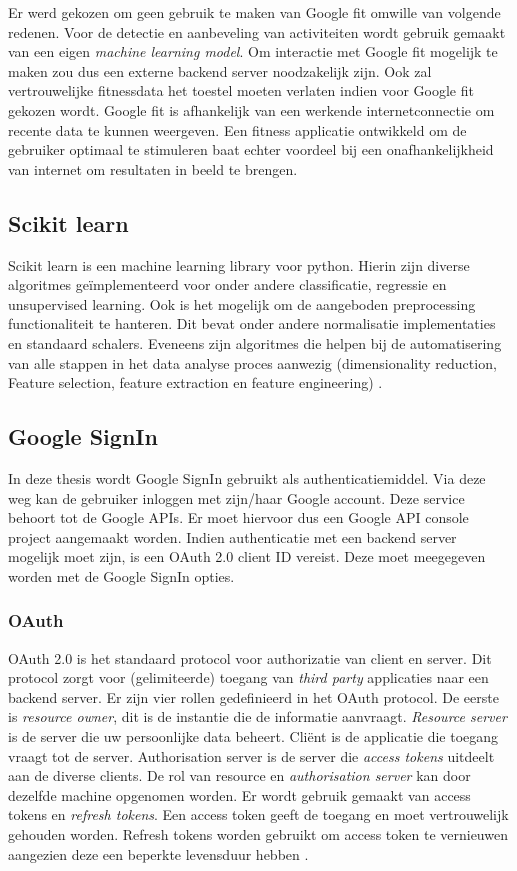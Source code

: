 \noindent
Er werd gekozen om geen gebruik te maken van Google fit omwille van volgende redenen. Voor de detectie en aanbeveling van activiteiten wordt gebruik gemaakt van een eigen \textit{machine learning model}. Om interactie met Google fit mogelijk te maken zou dus een externe backend server noodzakelijk zijn. 
Ook zal vertrouwelijke fitnessdata het toestel moeten verlaten indien voor Google fit gekozen wordt. 
Google fit is afhankelijk van een werkende internetconnectie om recente data te kunnen weergeven. Een fitness applicatie ontwikkeld om de gebruiker optimaal te stimuleren baat echter voordeel bij een onafhankelijkheid van internet om resultaten in beeld te brengen.

\subsection{Scikit learn}
Scikit learn is een machine learning library voor python. Hierin zijn diverse algoritmes geïmplementeerd voor onder andere classificatie, regressie en unsupervised learning. Ook is het mogelijk om de aangeboden preprocessing functionaliteit te hanteren. Dit bevat onder andere normalisatie implementaties en standaard schalers. Eveneens zijn algoritmes die helpen bij de automatisering van alle stappen in het data analyse proces aanwezig (dimensionality reduction, Feature selection, feature extraction en feature engineering) \cite{ref60}.

\subsection{Google SignIn}
In deze thesis wordt Google SignIn gebruikt als authenticatiemiddel. Via deze weg kan de gebruiker inloggen met zijn/haar Google account. Deze service behoort tot de Google APIs. Er moet hiervoor dus een Google API console project aangemaakt worden. Indien authenticatie met een backend server mogelijk moet zijn, is een OAuth 2.0 client ID vereist. Deze moet meegegeven worden met de Google SignIn opties. 

\subsubsection{OAuth}
OAuth 2.0 is het standaard protocol voor authorizatie van client en server. Dit protocol zorgt voor (gelimiteerde) toegang van \textit{third party} applicaties naar een backend server.
Er zijn vier rollen gedefinieerd in het OAuth protocol. De eerste is \textit{resource owner}, dit is de instantie die de informatie aanvraagt. \textit{Resource server} is de server die uw persoonlijke data beheert. Cliënt is de applicatie die toegang vraagt tot de server. Authorisation server is de server die \textit{access tokens} uitdeelt aan de diverse clients. De rol van resource en \textit{authorisation server} kan door dezelfde machine opgenomen worden. Er wordt gebruik gemaakt van access tokens en \textit{refresh tokens}. Een access token geeft de toegang en moet vertrouwelijk gehouden worden. Refresh tokens worden gebruikt om access token te vernieuwen aangezien deze een beperkte levensduur hebben \cite{ref25}.

